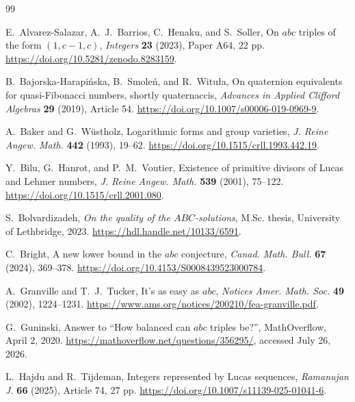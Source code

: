 \documentclass[11pt]{article}
\theoremstyle{remark}
\begin{document}
\begin{thebibliography}{99}

E.~Alvarez-Salazar, A.~J.~Barrios, C.~Henaku, and S.~Soller,
\newblock On \(abc\) triples of the form \((1,c-1,c)\),
\newblock \emph{Integers} \textbf{23} (2023), Paper A64, 22 pp.
\newblock \url{https://doi.org/10.5281/zenodo.8283159}.

B.~Bajorska-Harapi\'nska, B.~Smole\'n, and R.~Witu{\l}a,
\newblock On quaternion equivalents for quasi-Fibonacci numbers, shortly
quaternaccis,
\newblock \emph{Advances in Applied Clifford Algebras} \textbf{29} (2019),
Article 54.
\newblock \url{https://doi.org/10.1007/s00006-019-0969-9}.

A.~Baker and G.~W{\"u}stholz,
\newblock Logarithmic forms and group varieties,
\newblock \emph{J. Reine Angew. Math.} \textbf{442} (1993), 19--62.
\newblock \url{https://doi.org/10.1515/crll.1993.442.19}.

Y.~Bilu, G.~Hanrot, and P.~M.~Voutier,
\newblock Existence of primitive divisors of Lucas and Lehmer numbers,
\newblock \emph{J. Reine Angew. Math.} \textbf{539} (2001), 75--122.
\newblock \url{https://doi.org/10.1515/crll.2001.080}.

S.~Bolvardizadeh,
\newblock \emph{On the quality of the \(ABC\)-solutions},
\newblock M.Sc. thesis, University of Lethbridge, 2023.
\newblock \url{https://hdl.handle.net/10133/6591}.

C.~Bright,
\newblock A new lower bound in the \(abc\) conjecture,
\newblock \emph{Canad. Math. Bull.} \textbf{67} (2024), 369--378.
\newblock \url{https://doi.org/10.4153/S0008439523000784}.

A.~Granville and T.~J.~Tucker,
\newblock It's as easy as \(abc\),
\newblock \emph{Notices Amer. Math. Soc.} \textbf{49} (2002),
1224--1231.
\newblock \url{https://www.ams.org/notices/200210/fea-granville.pdf}.

G.~Guninski,
\newblock Answer to ``How balanced can \(abc\) triples be?'',
\newblock MathOverflow, April 2, 2020.
\newblock \url{https://mathoverflow.net/questions/356295/},
accessed July 26, 2026.

L.~Hajdu and R.~Tijdeman,
\newblock Integers represented by Lucas sequences,
\newblock \emph{Ramanujan J.} \textbf{66} (2025), Article 74, 27 pp.
\newblock \url{https://doi.org/10.1007/s11139-025-01041-6}.


\end{thebibliography}
\end{document}
